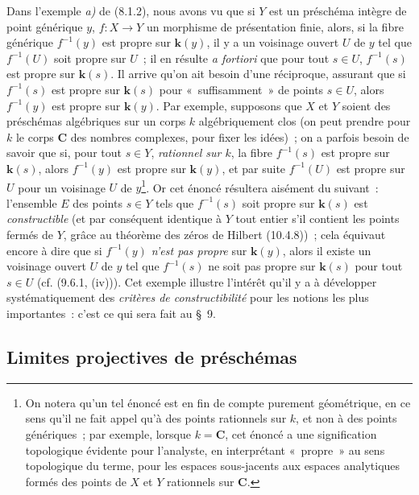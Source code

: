 \begin{env}[8.1.3]
\label{IV.8.1.3-fr}
Dans l'exemple \emph{a)} de (8.1.2), nous avons vu que si $Y$ est un
préschéma intègre de point générique $y$, $f:X\to Y$ un morphisme de
présentation finie, alors, si la fibre générique $f^{-1}(y)$ est propre sur
$\boldsymbol k(y)$, il y a un voisinage ouvert $U$ de $y$ tel que $f^{-1}(U)$
soit propre sur $U$~; il en résulte \emph{a fortiori} que pour tout $s\in U$,
$f^{-1}(s)$ est propre sur $\boldsymbol k(s)$. Il arrive qu'on ait besoin
d'une réciproque, assurant que si $f^{-1}(s)$ est propre sur
$\boldsymbol k(s)$ pour «~suffisamment~» de points $s\in U$, alors
$f^{-1}(y)$ est propre sur $\boldsymbol k(y)$. Par exemple, supposons que $X$
et $Y$ soient des préschémas algébriques sur un corps $k$ algébriquement clos
(on peut prendre pour $k$ le corps $\mathbf C$ des nombres complexes, pour
fixer les idées)~; on a parfois besoin de savoir que si, pour tout $s\in Y$,
\emph{rationnel sur $k$}, la fibre $f^{-1}(s)$ est propre sur
$\boldsymbol k(s)$, alors $f^{-1}(y)$ est propre sur $\boldsymbol k(y)$, et
par suite $f^{-1}(U)$ est propre sur $U$ pour un voisinage $U$ de
$y$\footnote{On notera qu'un tel énoncé est en fin de compte purement
géométrique, en ce sens qu'il ne fait appel qu'à des points rationnels sur
$k$, et non à des points génériques~; par exemple, lorsque $k=\mathbf C$, cet
énoncé a une signification topologique évidente pour l'analyste, en
interprétant «~propre~» au sens topologique du terme, pour les espaces
sous-jacents aux espaces analytiques formés des points de $X$ et $Y$
rationnels sur $\mathbf C$.}. Or cet énoncé résultera aisément du suivant~:
l'ensemble $E$ des points $s\in Y$ tels que $f^{-1}(s)$ soit propre sur
$\boldsymbol k(s)$ est \emph{constructible} (et par conséquent identique à
$Y$ tout entier s'il contient les points fermés de $Y$, grâce au théorème des
zéros de Hilbert (10.4.8))~; cela équivaut encore à dire que si $f^{-1}(y)$
\emph{n'est pas propre} sur $\boldsymbol k(y)$, alors il existe un voisinage
ouvert $U$ de $y$ tel que $f^{-1}(s)$ ne soit pas propre sur
$\boldsymbol k(s)$ pour tout $s\in U$ (cf. (9.6.1, (iv))). Cet exemple
illustre l'intérêt qu'il y a à développer systématiquement des \emph{critères
de constructibilité} pour les notions les plus importantes~: c'est ce qui
sera fait au \S~9.
\end{env}

\subsection{Limites projectives de préschémas}
\label{subsection:IV.8.2-fr}

